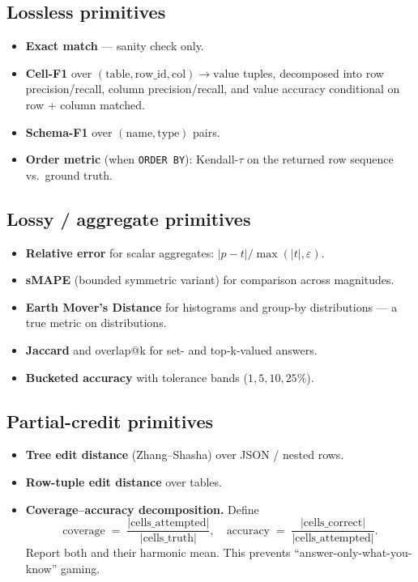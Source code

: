 \documentclass[11pt]{article}
\begin{document}
\subsection{Lossless primitives}
\begin{itemize}[leftmargin=*]
  \item \textbf{Exact match} --- sanity check only.
  \item \textbf{Cell-F1} over $(\text{table}, \text{row\_id},
    \text{col}) \to \text{value}$ tuples, decomposed into row
    precision/recall, column precision/recall, and value accuracy
    conditional on row + column matched.
  \item \textbf{Schema-F1} over $(\text{name}, \text{type})$ pairs.
  \item \textbf{Order metric} (when \texttt{ORDER BY}): Kendall-$\tau$ on
    the returned row sequence vs.\ ground truth.
\end{itemize}

\subsection{Lossy / aggregate primitives}
\begin{itemize}[leftmargin=*]
  \item \textbf{Relative error} for scalar aggregates:
    $|p - t| / \max(|t|, \varepsilon)$.
  \item \textbf{sMAPE} (bounded symmetric variant) for comparison across
    magnitudes.
  \item \textbf{Earth Mover's Distance} for histograms and group-by
    distributions --- a true metric on distributions.
  \item \textbf{Jaccard} and overlap@k for set- and top-k-valued
    answers.
  \item \textbf{Bucketed accuracy} with tolerance bands
    ($1, 5, 10, 25\%$).
\end{itemize}

\subsection{Partial-credit primitives}
\begin{itemize}[leftmargin=*]
  \item \textbf{Tree edit distance} (Zhang--Shasha) over JSON / nested
    rows.
  \item \textbf{Row-tuple edit distance} over tables.
  \item \textbf{Coverage--accuracy decomposition.} Define
    \[
      \mathrm{coverage} \;=\; \frac{|\text{cells\_attempted}|}{|\text{cells\_truth}|}, \quad
      \mathrm{accuracy} \;=\; \frac{|\text{cells\_correct}|}{|\text{cells\_attempted}|}.
    \]
    Report both and their harmonic mean. This prevents
    ``answer-only-what-you-know'' gaming.
\end{itemize}
\end{document}
